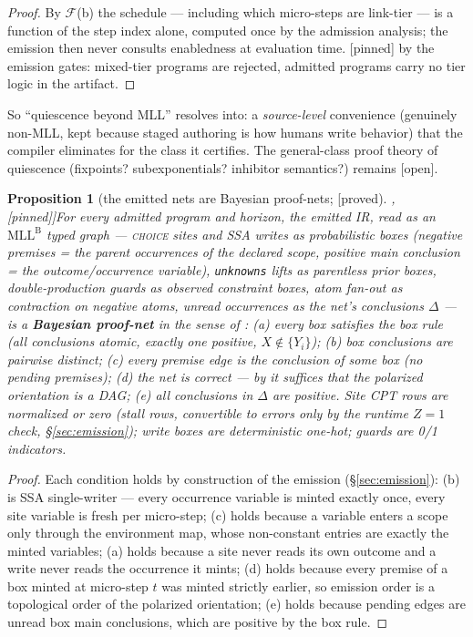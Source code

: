 \documentclass[11pt]{article}
\newcommand{\mllb}{\mathrm{MLL}^{\mathrm B}}
\newcommand{\cclass}{\mathcal{F}}                  %
\newcommand{\stproved}{[\textsf{proved}]}
\newcommand{\stpinned}{[\textsf{pinned}]}
\newcommand{\stopen}{[\textsf{open}]}
\theoremstyle{plain}
\newtheorem{proposition}[theorem]{Proposition}
\theoremstyle{definition}
\theoremstyle{remark}
\begin{document}
\begin{proof}
By $\cclass$(b) the schedule --- including which micro-steps are
link-tier --- is a function of the step index alone, computed once by
the admission analysis; the emission then never consults enabledness at
evaluation time. \stpinned{} by the emission gates: mixed-tier programs
are rejected, admitted programs carry no tier logic in the artifact.
\end{proof}

So ``quiescence beyond MLL'' resolves into: a \emph{source-level}
convenience (genuinely non-MLL, kept because staged authoring is how
humans write behavior) that the compiler eliminates for the class it
certifies. The general-class proof theory of quiescence (fixpoints?
subexponentials? inhibitor semantics?) remains \stopen{}.

\begin{proposition}[the emitted nets are Bayesian proof-nets;
\stproved{}, \stpinned{}]\label{prop:bpn}
For every admitted program and horizon, the emitted IR, read as an
$\mllb$ typed graph --- \textsc{choice} sites and SSA writes as
probabilistic boxes (negative premises = the parent occurrences of the
declared scope, positive main conclusion = the outcome/occurrence
variable), \texttt{unknowns} lifts as parentless prior boxes,
double-production guards as observed constraint boxes, atom fan-out as
contraction on negative atoms, unread occurrences as the net's
conclusions $\Delta$ --- is a \textbf{Bayesian proof-net} in the sense
of \cite[Defs.~3.1--3.2]{EFD26}: (a) every box satisfies the box rule
(all conclusions atomic, exactly one positive, $X \notin \{Y_i\}$); (b)
box conclusions are pairwise distinct; (c) every premise edge is the
conclusion of some box (no pending premises); (d) the net is correct
--- by \cite[Lemma~3.1]{EFD26} it suffices that the polarized
orientation is a DAG; (e) all conclusions in $\Delta$ are positive.
Site CPT rows are normalized or zero (stall rows, convertible to errors
only by the runtime $Z = 1$ check, \S\ref{sec:emission}); write boxes
are deterministic one-hot; guards are 0/1 indicators.
\end{proposition}

\begin{proof}
Each condition holds by construction of the emission
(\S\ref{sec:emission}): (b) is SSA single-writer --- every occurrence
variable is minted exactly once, every site variable is fresh per
micro-step; (c) holds because a variable enters a scope only through
the environment map, whose non-constant entries are exactly the minted
variables; (a) holds because a site never reads its own outcome and a
write never reads the occurrence it mints; (d) holds because every
premise of a box minted at micro-step $t$ was minted strictly earlier,
so emission order is a topological order of the polarized orientation;
(e) holds because pending edges are unread box main conclusions, which
are positive by the box rule.
\end{proof}
\end{document}
